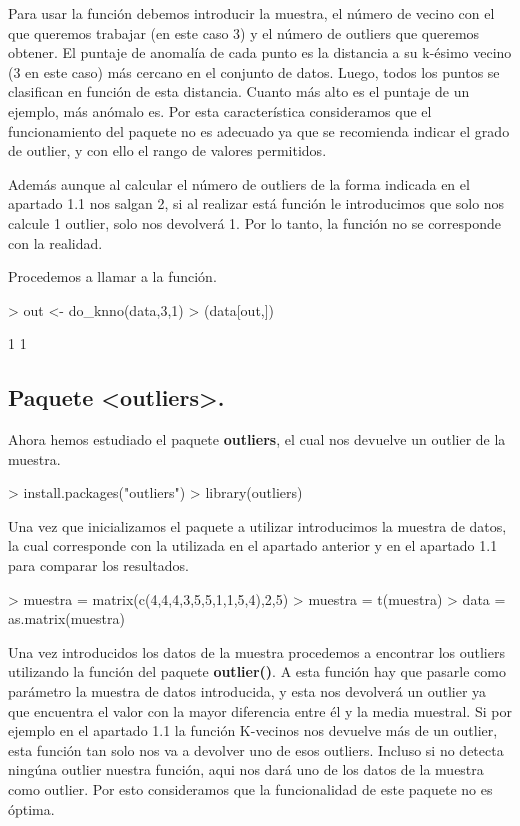 \documentclass [a4paper] {article}
\begin{document}
\bigskip
Para usar la función debemos introducir la muestra, el número de vecino con el que queremos trabajar
(en este caso 3) y el número de outliers que queremos obtener. El puntaje de anomalía de cada punto
es la distancia a su k-ésimo vecino (3 en este caso) más cercano en el conjunto de datos. Luego, todos
los puntos se clasifican en función de esta distancia. Cuanto más alto es el puntaje de un ejemplo,
más anómalo es. Por esta característica consideramos que el funcionamiento del paquete no es adecuado 
ya que se recomienda indicar el grado de outlier, y con ello el rango de valores permitidos.

\bigskip
Además aunque al calcular el número de outliers de la forma indicada en el apartado 1.1 nos salgan 2,
si al realizar está función le introducimos que solo nos calcule 1 outlier, solo nos devolverá 1.
Por lo tanto, la función no se corresponde con la realidad.

\bigskip
Procedemos a llamar a la función.
\begin{Schunk}
\begin{Sinput}
> out <- do_knno(data,3,1)
> (data[out,])
\end{Sinput}
\begin{Soutput}
[1] 1 1
\end{Soutput}
\end{Schunk}

\subsection{Paquete <outliers>.}
\bigskip
Ahora hemos estudiado el paquete \textbf{outliers}, el cual nos devuelve un outlier de la muestra.
\begin{Schunk}
\begin{Sinput}
> install.packages("outliers")
> library(outliers)
\end{Sinput}
\end{Schunk}

\bigskip
Una vez que inicializamos el paquete a utilizar introducimos la muestra de datos, la cual corresponde
con la utilizada en el apartado anterior y en el apartado 1.1 para comparar los resultados.
\begin{Schunk}
\begin{Sinput}
> muestra = matrix(c(4,4,4,3,5,5,1,1,5,4),2,5)
> muestra = t(muestra)
> data = as.matrix(muestra)
\end{Sinput}
\end{Schunk}

\bigskip
Una vez introducidos los datos de la muestra procedemos a encontrar los outliers utilizando la función
del paquete \textbf{outlier()}. A esta función hay que pasarle como parámetro la muestra de datos introducida,
y esta nos devolverá un outlier ya que encuentra el valor con la mayor diferencia entre él y la media
muestral. Si por ejemplo en el apartado 1.1 la función K-vecinos nos devuelve más de un outlier, 
esta función tan solo nos va a devolver uno de esos outliers. Incluso si no detecta ningúna outlier nuestra
función, aqui nos dará uno de los datos de la muestra como outlier. Por esto consideramos que la 
funcionalidad de este paquete no es óptima.
\end{document}
